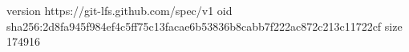 version https://git-lfs.github.com/spec/v1
oid sha256:2d8fa945f984ef4c5ff75c13facae6b53836b8cabb7f222ac872c213c11722cf
size 174916
